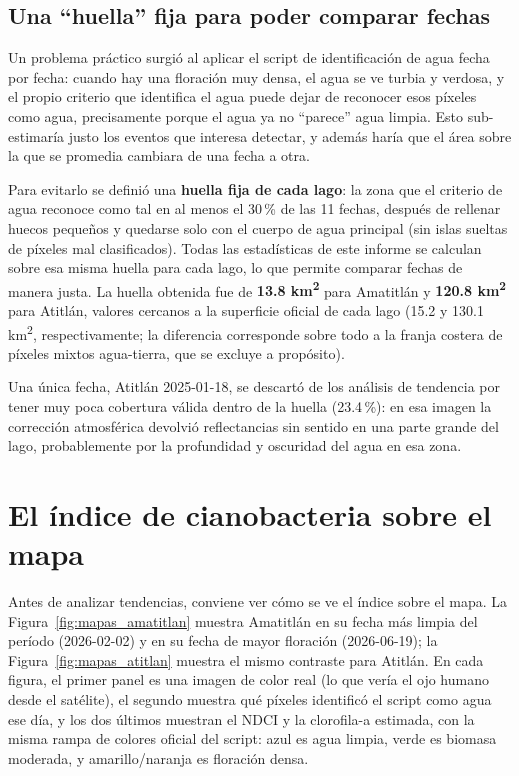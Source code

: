 \documentclass[11pt]{article}
\begin{document}
\subsection{Una ``huella'' fija para poder comparar fechas}

Un problema pr\'actico surgi\'o al aplicar el script de identificaci\'on de agua fecha por fecha: cuando hay una floraci\'on muy densa, el agua se ve turbia y verdosa, y el propio criterio que identifica el agua puede dejar de reconocer esos p\'ixeles como agua, precisamente porque el agua ya no ``parece'' agua limpia. Esto sub-estimar\'ia justo los eventos que interesa detectar, y adem\'as har\'ia que el \'area sobre la que se promedia cambiara de una fecha a otra.

Para evitarlo se defini\'o una \textbf{huella fija de cada lago}: la zona que el criterio de agua reconoce como tal en al menos el 30\,\% de las 11 fechas, despu\'es de rellenar huecos peque\~nos y quedarse solo con el cuerpo de agua principal (sin islas sueltas de p\'ixeles mal clasificados). Todas las estad\'isticas de este informe se calculan sobre esa misma huella para cada lago, lo que permite comparar fechas de manera justa. La huella obtenida fue de \textbf{13.8 km\textsuperscript{2}} para Amatitl\'an y \textbf{120.8 km\textsuperscript{2}} para Atitl\'an, valores cercanos a la superficie oficial de cada lago (15.2 y 130.1 km\textsuperscript{2}, respectivamente; la diferencia corresponde sobre todo a la franja costera de p\'ixeles mixtos agua-tierra, que se excluye a prop\'osito).

Una \'unica fecha, Atitl\'an 2025-01-18, se descart\'o de los an\'alisis de tendencia por tener muy poca cobertura v\'alida dentro de la huella (23.4\,\%): en esa imagen la correcci\'on atmosf\'erica devolvi\'o reflectancias sin sentido en una parte grande del lago, probablemente por la profundidad y oscuridad del agua en esa zona.

\section{El \'indice de cianobacteria sobre el mapa}

Antes de analizar tendencias, conviene ver c\'omo se ve el \'indice sobre el mapa. La Figura~\ref{fig:mapas_amatitlan} muestra Amatitl\'an en su fecha m\'as limpia del per\'iodo (2026-02-02) y en su fecha de mayor floraci\'on (2026-06-19); la Figura~\ref{fig:mapas_atitlan} muestra el mismo contraste para Atitl\'an. En cada figura, el primer panel es una imagen de color real (lo que ver\'ia el ojo humano desde el sat\'elite), el segundo muestra qu\'e p\'ixeles identific\'o el script como agua ese d\'ia, y los dos \'ultimos muestran el NDCI y la clorofila-a estimada, con la misma rampa de colores oficial del script: azul es agua limpia, verde es biomasa moderada, y amarillo/naranja es floraci\'on densa.
\end{document}
